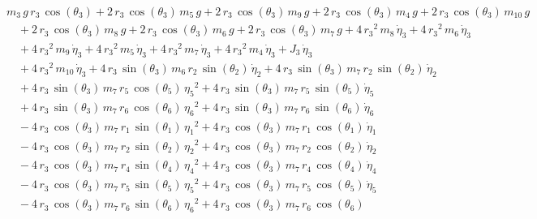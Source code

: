\begin{eqnarray*} && m_{3}\,g\,r_{3}\,\cos({\theta_{3}}) + 2\,r_{3}\,
\cos({\theta_{3}})\,m_{5}\,g + 2\,r_{3}\,\cos({\theta_{3}})\,m_{9}\,g
 + 2\,r_{3}\,\cos({\theta_{3}})\,m_{4}\,g + 2\,r_{3}\,\cos({\theta_{3}
})\,m_{10}\,g \\ &&\quad\mbox{} + 2\,r_{3}\,\cos({\theta_{3}})\,m_{8}
\,g + 2\,r_{3}\,\cos({\theta_{3}})\,m_{6}\,g + 2\,r_{3}\,\cos({\theta
_{3}})\,m_{7}\,g + 4\,{r_{3}}^2\,m_{8}\,{\dot{\eta}_{3}} + 4\,{r_{3}}^
2\,m_{6}\,{\dot{\eta}_{3}} \\ &&\quad\mbox{} + 4\,{r_{3}}^2\,m_{9}\,{
\dot{\eta}_{3}} + 4\,{r_{3}}^2\,m_{5}\,{\dot{\eta}_{3}} + 4\,{r_{3}}^2
\,m_{7}\,{\dot{\eta}_{3}} + 4\,{r_{3}}^2\,m_{4}\,{\dot{\eta}_{3}} + J
_{3}\,{\dot{\eta}_{3}} \\ &&\quad\mbox{} + 4\,{r_{3}}^2\,m_{10}\,{
\dot{\eta}_{3}} + 4\,r_{3}\,\sin({\theta_{3}})\,m_{6}\,r_{2}\,\sin({
\theta_{2}})\,{\dot{\eta}_{2}} + 4\,r_{3}\,\sin({\theta_{3}})\,m_{7}\,
r_{2}\,\sin({\theta_{2}})\,{\dot{\eta}_{2}} \\ &&\quad\mbox{} + 4\,r_{
3}\,\sin({\theta_{3}})\,m_{7}\,r_{5}\,\cos({\theta_{5}})\,{{\eta_{5}}}
^2 + 4\,r_{3}\,\sin({\theta_{3}})\,m_{7}\,r_{5}\,\sin({\theta_{5}})\,{
\dot{\eta}_{5}} \\ &&\quad\mbox{} + 4\,r_{3}\,\sin({\theta_{3}})\,m_{7
}\,r_{6}\,\cos({\theta_{6}})\,{{\eta_{6}}}^2 + 4\,r_{3}\,\sin({\theta
_{3}})\,m_{7}\,r_{6}\,\sin({\theta_{6}})\,{\dot{\eta}_{6}}
 \\ &&\quad\mbox{} - 4\,r_{3}\,\cos({\theta_{3}})\,m_{7}\,r_{1}\,\sin(
{\theta_{1}})\,{{\eta_{1}}}^2 + 4\,r_{3}\,\cos({\theta_{3}})\,m_{7}\,r
_{1}\,\cos({\theta_{1}})\,{\dot{\eta}_{1}} \\ &&\quad\mbox{} - 4\,r_{3
}\,\cos({\theta_{3}})\,m_{7}\,r_{2}\,\sin({\theta_{2}})\,{{\eta_{2}}}^
2 + 4\,r_{3}\,\cos({\theta_{3}})\,m_{7}\,r_{2}\,\cos({\theta_{2}})\,{
\dot{\eta}_{2}} \\ &&\quad\mbox{} - 4\,r_{3}\,\cos({\theta_{3}})\,m_{7
}\,r_{4}\,\sin({\theta_{4}})\,{{\eta_{4}}}^2 + 4\,r_{3}\,\cos({\theta
_{3}})\,m_{7}\,r_{4}\,\cos({\theta_{4}})\,{\dot{\eta}_{4}}
 \\ &&\quad\mbox{} - 4\,r_{3}\,\cos({\theta_{3}})\,m_{7}\,r_{5}\,\sin(
{\theta_{5}})\,{{\eta_{5}}}^2 + 4\,r_{3}\,\cos({\theta_{3}})\,m_{7}\,r
_{5}\,\cos({\theta_{5}})\,{\dot{\eta}_{5}} \\ &&\quad\mbox{} - 4\,r_{3
}\,\cos({\theta_{3}})\,m_{7}\,r_{6}\,\sin({\theta_{6}})\,{{\eta_{6}}}^
2 + 4\,r_{3}\,\cos({\theta_{3}})\,m_{7}\,r_{6}\,\cos({\theta_{6}})\,{
}
\end{eqnarray*}
